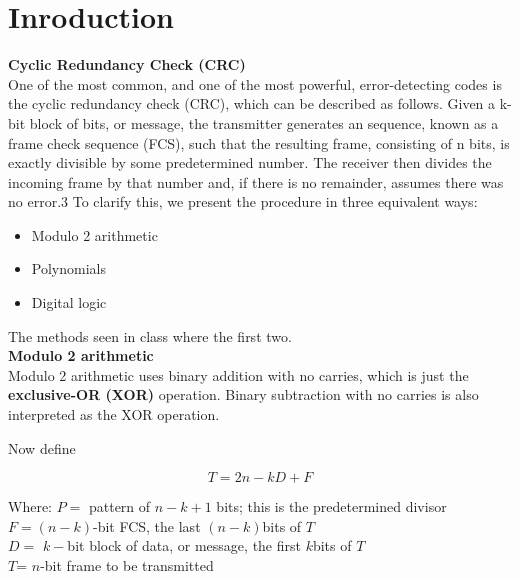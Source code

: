 \section{Inroduction}

\textbf{Cyclic Redundancy Check (CRC)}\\

One of the most common, and one of the most powerful, error-detecting codes is the
cyclic redundancy check (CRC), which can be described as follows. Given a k-bit
block of bits, or message, the transmitter generates an sequence, known
as a frame check sequence (FCS), such that the resulting frame, consisting of n bits,
is exactly divisible by some predetermined number. The receiver then divides the
incoming frame by that number and, if there is no remainder, assumes there was no
error.3
To clarify this, we present the procedure in three equivalent ways:

\begin{itemize}
	\item Modulo 2 arithmetic
	\item Polynomials
	\item Digital logic
\end{itemize}

The methods seen in class where the first two.\\


\textbf{Modulo 2 arithmetic}\\

Modulo 2 arithmetic uses binary addition with no carries,
which is just the \textbf{ exclusive-OR (XOR)} operation. Binary subtraction with no carries
is also interpreted as the XOR operation.

Now define

\begin{equation*}
	T = 2n-kD + F
\end{equation*}

Where:
$P =$ pattern of $n - k + 1$ bits; this is the predetermined divisor\\
$F = (n - k)$-bit FCS, the last $(n - k) $bits of $T$\\
$D =$ $k-$bit block of data, or message, the first $k $bits of $T$\\
$T$= $n$-bit frame to be transmitted